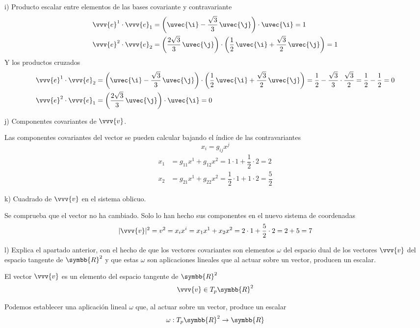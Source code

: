 \noindent
i) Producto escalar entre elementos de las bases covariante y contravariante
\begin{align*}
  \vvv{e}^1\cdot\vvv{e}_1
  &=
    \left(\uvec{\i} - \dfrac{\sqrt{3}}{3}\,\uvec{\j}\right)
    \cdot
    \uvec{\i}
    = 1\\
  \vvv{e}^2\cdot\vvv{e}_2
  &=
    \left(\dfrac{2\sqrt{3}}{3}\,\uvec{\j}\right)
    \cdot
    \left(\dfrac{1}{2}\,\uvec{\i} + \dfrac{\sqrt{3}}{2}\,\uvec{\j}\right)
    = 1
\end{align*}
Y los productos cruzados
\begin{align*}
  \vvv{e}^1\cdot\vvv{e}_2
  &=
    \left(\uvec{\i} - \dfrac{\sqrt{3}}{3}\,\uvec{\j}\right)
    \cdot
    \left(\dfrac{1}{2}\,\uvec{\i} + \dfrac{\sqrt{3}}{2}\,\uvec{\j}\right)
    = \dfrac{1}{2} - \dfrac{\sqrt{3}}{3}\cdot\dfrac{\sqrt{3}}{2}
    = \dfrac{1}{2} - \dfrac{1}{2}
    = 0\\
  \vvv{e}^2\cdot\vvv{e}_1
  &=
    \left(
    \dfrac{2\sqrt{3}}{3}\,\uvec{\j}\right) \cdot \uvec{\i}
    = 0
\end{align*}

\noindent
j) Componentes covariantes de $\vvv{v}$.

Las componentes covariantes del vector se pueden calcular bajando el índice de las
contravariantes
\[
  x_i = g_{ij} x^j
\]
\begin{align*}
  x_1
  &=
    g_{11} x^1 + g_{12} x^2
    = 1\cdot 1 + \dfrac{1}{2} \cdot 2
    =  2\\
  x_2
  &=
    g_{21} x^1 + g_{22} x^2
    = \dfrac{1}{2} \cdot 1 + 1\cdot 2
    = \dfrac{5}{2}
\end{align*}

\noindent
k) Cuadrado de $\vvv{v}$ en el sistema oblicuo.

Se comprueba que el vector no ha cambiado. Solo lo han hecho sus componentes en el nuevo
sistema de coordenadas
\[
  |\vvv{v}|^2
  = v^2
  = x_ix^i
  = x_1x^1 + x_2x^2
  = 2\cdot 1 + \dfrac{5}{2}\cdot 2
  = 2 + 5
  = 7
\]

\noindent
l) Explica el apartado anterior, con el hecho de que los vectores covariantes son
elementos $\omega$ del espacio dual de los vectores $\vvv{v}$ del espacio tangente de
$\symbb{R}^2$ y que estas $\omega$ son aplicaciones lineales que al actuar sobre un
vector, producen un escalar.

El vector $\vvv{v}$ es un elemento del espacio tangente de $\symbb{R}^2$
\[
  \vvv{v} \in T_p\symbb{R}^2
\]

Podemos establecer una aplicación lineal $\omega$ que, al actuar sobre un vector, produce
un escalar
\[
  \omega: T_p\symbb{R}^2 \rightarrow \symbb{R}
\]

